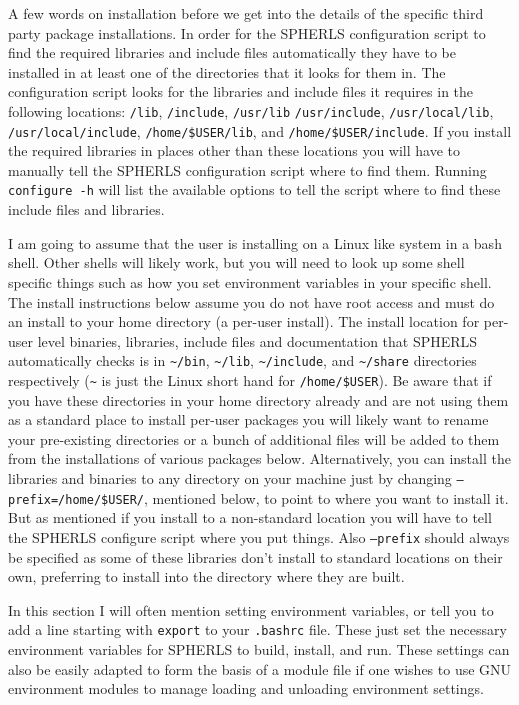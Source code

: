 \documentclass[12pt,a4paper]{book}
\begin{document}
A few words on installation before we get into the details of the specific third party package installations. In order for the SPHERLS configuration script to find the required libraries and include files automatically they have to be installed in at least one of the directories that it looks for them in. The configuration script looks for the libraries and include files it requires in the following locations: {\tt /lib}, {\tt /include}, {\tt /usr/\-lib} {\tt /usr/\-include}, {\tt /usr/local/lib}, {\tt /usr/\-local/\-include}, {\tt /home/\-\$USER/\-lib}, and {\tt /home/\-\$USER/\-include}. If you install the required libraries in places other than these locations you will have to manually tell the SPHERLS configuration script where to find them. Running {\tt configure -h} will list the available options to tell the script where to find these include files and libraries.

I am going to assume that the user is installing on a Linux like system in a bash shell. Other shells will likely work, but you will need to look up some shell specific things such as how you set environment variables in your specific shell. The install instructions below assume you do not have root access and must do an install to your home directory (a per-user install). The install location for per-user level binaries, libraries, include files and documentation that SPHERLS automatically checks is in {\tt \textasciitilde/bin}, {\tt \textasciitilde/lib}, {\tt \textasciitilde/include}, and {\tt \textasciitilde/share} directories respectively ({\tt \textasciitilde} is just the Linux short hand for {\tt /home/\-\$USER}). Be aware that if you have these directories in your home directory already and are not using them as a standard place to install per-user packages you will likely want to rename your pre-existing directories or a bunch of additional files will be added to them from the installations of various packages below. Alternatively, you can install the libraries and binaries to any directory on your machine just by changing {\tt --prefix\-=/home/\-\$USER/}, mentioned below, to point to where you want to install it. But as mentioned if you install to a non-standard location you will have to tell the SPHERLS configure script where you put things. Also {\tt --prefix} should always be specified as some of these libraries don't install to standard locations on their own, preferring to install into the directory where they are built.

In this section I will often mention setting environment variables, or tell you to add a line starting with {\tt export} to your {\tt .bashrc} file. These just set the necessary environment variables for SPHERLS to build, install, and run. These settings can also be easily adapted to form the basis of a module file if one wishes to use GNU environment modules to manage loading and unloading environment settings.
\end{document}
